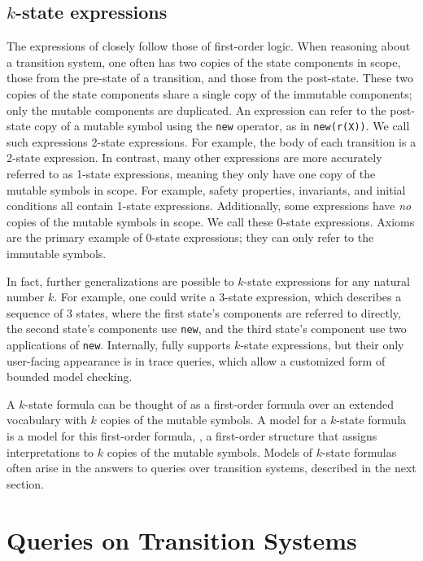 \subsection{$k$-state expressions}

The expressions of \mypyvy closely follow those of first-order logic.
When reasoning about a transition system,
  one often has two copies of the state components in scope,
  those from the pre-state of a transition, and those from the post-state.
These two copies of the state components share a single copy of the immutable components;
  only the mutable components are duplicated.
An expression can refer to the post-state copy of a mutable symbol
  using the \lstinline[language=mypyvy]{new} operator,
  as in \lstinline[language=mypyvy]{new(r(X))}.
We call such expressions 2-state expressions.
For example, the body of each transition is a 2-state expression.
In contrast, many other expressions are
  more accurately referred to as 1-state expressions,
  meaning they only have one copy of the mutable symbols in scope.
For example, safety properties, invariants,
  and initial conditions all contain 1-state expressions.
Additionally, some expressions have \emph{no} copies of the mutable symbols in scope.
We call these 0-state expressions.
Axioms are the primary example of 0-state expressions;
  they can only refer to the immutable symbols.

In fact, further generalizations are possible
  to $k$-state expressions for any natural number $k$.
For example, one could write a 3-state expression,
  which describes a sequence of 3 states,
  where the first state's components are referred to directly,
  the second state's components use \lstinline[language=mypyvy]{new},
  and the third state's component use two applications of \lstinline[language=mypyvy]{new}.
Internally, \mypyvy fully supports $k$-state expressions,
  but their only user-facing appearance is in trace queries,
  which allow a customized form of bounded model checking.

A $k$-state formula can be thought of as a first-order formula
  over an extended vocabulary with $k$ copies of the mutable symbols.
A model for a $k$-state formula is a model for this first-order formula,
  \ie, a first-order structure that assigns interpretations to $k$ copies of the mutable symbols.
Models of $k$-state formulas often arise in the answers to queries over transition systems, 
  described in the next section.

\section{Queries on Transition Systems}\label{sec:mypyvy-queries}

